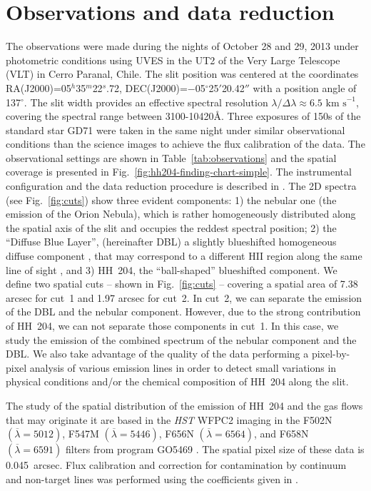 \documentclass[twocolumn,linenumbers]{aastex63}
\begin{document}
\section{Observations and data reduction}
\label{sec:data}

The observations were made during the nights of October 28 and 29, 2013 under photometric conditions using UVES in the UT2 of the Very Large Telescope (VLT) in Cerro Paranal, Chile. The slit position was centered at the coordinates RA(J2000)=05$^h$35$^m$22$^s$.72, DEC(J2000)=$-$05$^{\circ}$25$'$20.42$''$ with a position angle of 137$^{\circ}$. The slit width provides an effective spectral resolution $\lambda/\Delta \lambda \approx 6.5 \text{ km s}^{-1}$, covering the spectral range between 3100-10420\AA. Three exposures of 150s of the standard star GD71 \citep{Moehler14a, Moehler14b} were taken in the same night under similar observational conditions than the science images to achieve the flux calibration of the data. The observational settings are shown in Table~\ref{tab:observations} and the spatial coverage is presented in Fig.~\ref{fig:hh204-finding-chart-simple}. The instrumental configuration and the data reduction procedure is described in \citet[][hereinafter Paper~I]{mendez2021}. The 2D spectra (see Fig.~\ref{fig:cuts}) show three evident components: 1) the nebular one (the emission of the Orion Nebula), which is rather homogeneously distributed along the spatial axis of the slit and occupies the reddest spectral position; 2) the ``Diffuse Blue Layer'', (hereinafter DBL) a slightly blueshifted homogeneous diffuse component  \citep[previously detected by][]{Deharveng73}, that may correspond to a different H\thinspace II region along the same line of sight \citep{garciadiaz07}, and 3) HH~204, the ``ball-shaped'' blueshifted component. We define two spatial cuts -- shown in Fig.~\ref{fig:cuts} -- covering a spatial area of 7.38 arcsec for cut~1 and 1.97 arcsec for cut~2. In cut~2, we can separate the emission of the DBL and the nebular component. However, due to the strong contribution of HH~204, we can not separate those components in cut~1. In this case, we study the emission of the combined spectrum of the nebular component and the DBL. We also take advantage of the quality of the data performing a pixel-by-pixel analysis of various emission lines in order to detect small variations in physical conditions and/or the chemical composition of HH~204 along the slit.

The study of the spatial distribution of the emission of HH~204 and the gas flows that may originate it are based in the \textit{HST} WFPC2 imaging in the F502N  {\boldmath${ (\overline{\lambda}=5012)}$}, F547M {\boldmath ${ (\overline{\lambda}=5446)}$}, F656N {\boldmath ${(\overline{\lambda}=6564)}$}, and F658N {\boldmath ${(\overline{\lambda}=6591)}$} filters from program GO5469 \citep{ODell:1996a}. The spatial pixel size of these data is \SI{0.045}{arcsec}. Flux calibration and correction for contamination by continuum and non-target lines was performed using the coefficients given in \citet{ODell:2009b}. 
\end{document}
